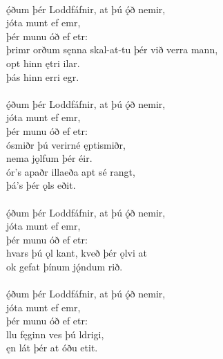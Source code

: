  \\

\bva {}ǫ́ðum þér Loddfáfnir, \hld at þú ǫ́ð nemir, \\%
\ind {}jóta munt ef emr, \\%
\ind þér munu óð ef etr: \\%
þrimr orðum sęnna \hld skal-at-tu þér við verra mann, \\%
\ind opt hinn ętri ilar. \\%
\ind þás hinn erri egr.\\%

 \\

\bva {}ǫ́ðum þér Loddfáfnir, \hld at þú ǫ́ð nemir, \\%
\ind {}jóta munt ef emr, \\%
\ind þér munu óð ef etr: \\%
ósmiðr þú verir\hld né ęptismiðr, \\%
\ind nema jǫlfum þér éir. \\%
ór's apaðr illa\hld eða apt sé rangt, \\%
\ind þá's þér ǫls eðit.\\%

 \\

\bva {}ǫ́ðum þér Loddfáfnir, \hld at þú ǫ́ð nemir, \\%
\ind {}jóta munt ef emr, \\%
\ind þér munu óð ef etr: \\%
hvars þú ǫl kant, \hld kveð þér ǫlvi at \\%
\ind ok gefat þínum jǫ́ndum rið.\\%

 \\

\bva {}ǫ́ðum þér Loddfáfnir, \hld at þú ǫ́ð nemir, \\%
\ind {}jóta munt ef emr, \\%
\ind þér munu óð ef etr: \\%
llu fęginn \hld ves þú ldrigi, \\%
\ind ęn lát þér at óðu etit.\\%

